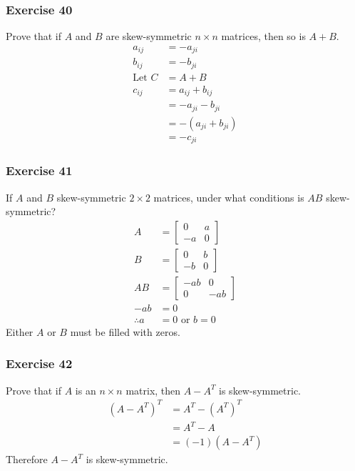 \documentclass{math}
\begin{document}
\subsubsection*{Exercise 40}
Prove that if \( A \) and \( B \) are skew-symmetric \( n\times n \) matrices,
then so is \( A+B \).
\begin{align*}
  a_{ij} &= -a_{ji} \\
  b_{ij} &= -b_{ji} \\
  \text{Let } C &= A+B \\
  c_{ij} &= a_{ij}+b_{ij} \\
  &= -a_{ji}-b_{ji} \\
  &= -(a_{ji}+b_{ji}) \\
  &= -c_{ji}
\end{align*}

\subsubsection*{Exercise 41}
If \( A \) and \( B \) skew-symmetric \( 2\times2 \) matrices, under what
conditions is \( AB \) skew-symmetric?
\begin{align*}
  A &= \begin{bmatrix}
    0 & a \\
    -a & 0
  \end{bmatrix} \\
  B &= \begin{bmatrix}
    0 & b \\
    -b & 0
  \end{bmatrix} \\
  AB &= \begin{bmatrix}
    -ab & 0 \\
    0 & -ab
  \end{bmatrix} \\
  -ab &= 0 \\
  \therefore a &= 0 \text{ or } b = 0
\end{align*}
Either \( A \) or \( B \) must be filled with zeros.

\subsubsection*{Exercise 42}
Prove that if \( A \) is an \( n\times n \) matrix, then \( A-A^T \) is
skew-symmetric.
\begin{align*}
  (A-A^T)^T &= A^T-(A^T)^T \\
  &= A^T-A \\
  &= (-1)(A-A^T)
\end{align*}
Therefore \( A-A^T \) is skew-symmetric.
\end{document}
